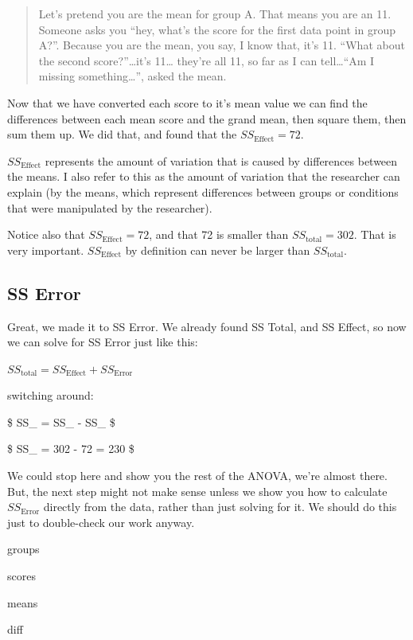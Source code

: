 \documentclass[]{book}
\begin{document}
\begin{quote}
Let's pretend you are the mean for group A. That means you are an 11. Someone asks you ``hey, what's the score for the first data point in group A?''. Because you are the mean, you say, I know that, it's 11. ``What about the second score?''\ldots{}it's 11\ldots{} they're all 11, so far as I can tell\ldots{}``Am I missing something\ldots{}'', asked the mean.
\end{quote}

Now that we have converted each score to it's mean value we can find the differences between each mean score and the grand mean, then square them, then sum them up. We did that, and found that the \(SS_\text{Effect} = 72\).

\(SS_\text{Effect}\) represents the amount of variation that is caused by differences between the means. I also refer to this as the amount of variation that the researcher can explain (by the means, which represent differences between groups or conditions that were manipulated by the researcher).

Notice also that \(SS_\text{Effect} = 72\), and that 72 is smaller than \(SS_\text{total} = 302\). That is very important. \(SS_\text{Effect}\) by definition can never be larger than \(SS_\text{total}\).

\hypertarget{ss-error}{%
\subsection{SS Error}\label{ss-error}}

Great, we made it to SS Error. We already found SS Total, and SS Effect, so now we can solve for SS Error just like this:

\(SS_\text{total} = SS_\text{Effect} + SS_\text{Error}\)

switching around:

\$ SS\_ = SS\_ - SS\_ \$

\$ SS\_ = 302 - 72 = 230 \$

We could stop here and show you the rest of the ANOVA, we're almost there. But, the next step might not make sense unless we show you how to calculate \(SS_\text{Error}\) directly from the data, rather than just solving for it. We should do this just to double-check our work anyway.

groups

scores

means

diff
\end{document}
